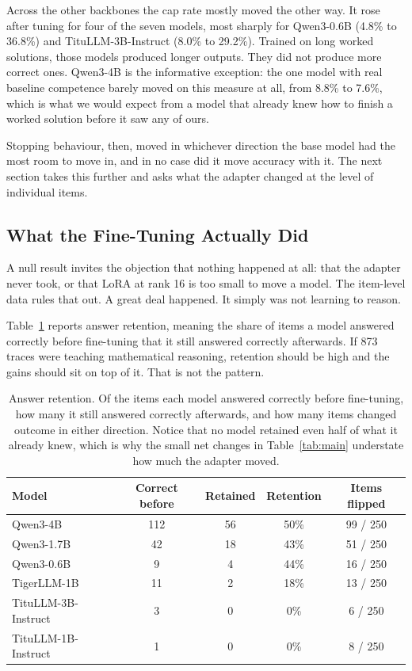 \documentclass[10pt,twocolumn,letterpaper]{article}
\begin{document}
Across the other backbones the cap rate mostly moved the other way. It rose
after tuning for four of the seven models, most sharply for Qwen3-0.6B (4.8\%
to 36.8\%) and TituLLM-3B-Instruct (8.0\% to 29.2\%). Trained on long worked
solutions, those models produced longer outputs. They did not produce more
correct ones. Qwen3-4B is the informative exception: the one model with real
baseline competence barely moved on this measure at all, from 8.8\% to 7.6\%,
which is what we would expect from a model that already knew how to finish a
worked solution before it saw any of ours.

Stopping behaviour, then, moved in whichever direction the base model had the
most room to move in, and in no case did it move accuracy with it. The next
section takes this further and asks what the adapter changed at the level of
individual items.

\subsection{What the Fine-Tuning Actually Did}
\label{sec:retention}

A null result invites the objection that nothing happened at all: that the
adapter never took, or that LoRA at rank 16 is too small to move a model. The
item-level data rules that out. A great deal happened. It simply was not
learning to reason.

Table~\ref{tab:retention} reports answer retention, meaning the share of items
a model answered correctly before fine-tuning that it still answered correctly
afterwards. If 873 traces were teaching mathematical reasoning, retention
should be high and the gains should sit on top of it. That is not the pattern.

\begin{table}[htbp]
\caption{Answer retention. Of the items each model answered correctly
before fine-tuning, how many it still answered correctly afterwards, and
how many items changed outcome in either direction. Notice that no model
retained even half of what it already knew, which is why the small net
changes in Table~\ref{tab:main} understate how much the adapter moved.}
\label{tab:retention}
\centering\small
\begin{tabular}{|l|c|c|c|c|}
\hline
\textbf{Model} & \textbf{Correct before} & \textbf{Retained} & \textbf{Retention} & \textbf{Items flipped} \\
\hline
Qwen3-4B & 112 & 56 & 50\% & 99 / 250 \\
Qwen3-1.7B & 42 & 18 & 43\% & 51 / 250 \\
Qwen3-0.6B & 9 & 4 & 44\% & 16 / 250 \\
TigerLLM-1B & 11 & 2 & 18\% & 13 / 250 \\
TituLLM-3B-Instruct & 3 & 0 & 0\% & 6 / 250 \\
TituLLM-1B-Instruct & 1 & 0 & 0\% & 8 / 250 \\
\hline
\end{tabular}
\end{table}
\end{document}
